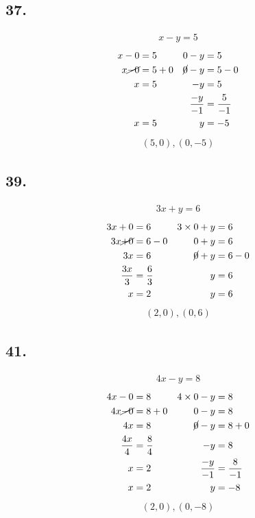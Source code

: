 \documentclass{article}
\begin{document}
    \subsection*{37.}
    \begin{align*}
        x - y = 5
    \end{align*}
    \begin{align*}
        x - 0 &= 5 &0 -y &= 5 \\
        x \cancel{- 0} &=5 + 0 &\cancel{0} - y &= 5 - 0\\
        x &= 5 &-y &= 5\\
        &&\frac{-y}{-1} &= \frac{5}{-1}\\
        x &=5 &y &=-5
    \end{align*}
    \begin{align*}
        \boxed{(5,0), (0,-5)}
    \end{align*}

    \subsection*{39.}
    \begin{align*}
        3x + y = 6
    \end{align*}
    \begin{align*}
        3x + 0 &= 6 &3 \times 0 + y &= 6 \\
        3x \cancel{+ 0} &=6 - 0 &0 + y &= 6\\
        3x &= 6 &\cancel{0} +y &= 6 - 0\\
        \frac{3x}{3} &= \frac{6}{3} &y &= 6\\
        x &=2 &y &=6
    \end{align*}
    \begin{align*}
        \boxed{(2,0), (0,6)}
    \end{align*}

    \subsection*{41.}
    \begin{align*}
        4x - y = 8
    \end{align*}
    \begin{align*}
        4x - 0 &= 8 &4 \times 0 - y &= 8 \\
        4x \cancel{- 0} &=8 + 0 &0 - y &= 8\\
        4x &= 8 &\cancel{0} -y &= 8 + 0\\
        \frac{4x}{4} &= \frac{8}{4} &-y &= 8\\
        x &=2 &\frac{-y}{-1} &=\frac{8}{-1}\\
        x &=2 &y &=-8
    \end{align*}
    \begin{align*}
        \boxed{(2,0), (0,-8)}
    \end{align*}
\end{document}

